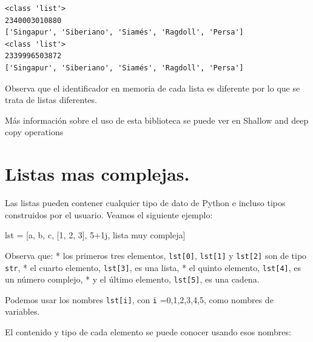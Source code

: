 \documentclass[
  spanish,
  letterpaper,
]{scrbook}
\newenvironment{Shaded}{\begin{snugshade}}{\end{snugshade}}
\newcommand{\DecValTok}[1]{\textcolor[rgb]{0.68,0.00,0.00}{#1}}
\newcommand{\NormalTok}[1]{\textcolor[rgb]{0.00,0.23,0.31}{#1}}
\newcommand{\OperatorTok}[1]{\textcolor[rgb]{0.37,0.37,0.37}{#1}}
\newcommand{\OtherTok}[1]{\textcolor[rgb]{0.00,0.23,0.31}{#1}}
\newcommand{\StringTok}[1]{\textcolor[rgb]{0.13,0.47,0.30}{#1}}
\theoremstyle{definition}
\theoremstyle{remark}
\begin{document}
\begin{verbatim}
<class 'list'>
2340003010880
['Singapur', 'Siberiano', 'Siamés', 'Ragdoll', 'Persa']
<class 'list'>
2339996503872
['Singapur', 'Siberiano', 'Siamés', 'Ragdoll', 'Persa']
\end{verbatim}

Observa que el identificador en memoria de cada lista es diferente por
lo que se trata de listas diferentes.

Más información sobre el uso de esta biblioteca se puede ver en Shallow
and deep copy operations

\section{Listas mas complejas.}\label{listas-mas-complejas.}

Las listas pueden contener cualquier tipo de dato de Python e incluso
tipos construidos por el usuario. Veamos el siguiente ejemplo:

\begin{Shaded}
\begin{Highlighting}[]
\NormalTok{lst }\OperatorTok{=}\NormalTok{ [}\StringTok{\textquotesingle{}a\textquotesingle{}}\NormalTok{, }\StringTok{\textquotesingle{}b\textquotesingle{}}\NormalTok{, }\StringTok{\textquotesingle{}c\textquotesingle{}}\NormalTok{, [}\DecValTok{1}\NormalTok{, }\DecValTok{2}\NormalTok{, }\DecValTok{3}\NormalTok{], }\DecValTok{5}\OperatorTok{+}\OtherTok{1j}\NormalTok{, }\StringTok{\textquotesingle{}lista muy compleja\textquotesingle{}}\NormalTok{]}
\end{Highlighting}
\end{Shaded}

Observa que: * los primeros tres elementos, \texttt{lst{[}0{]}},
\texttt{lst{[}1{]}} y \texttt{lst{[}2{]}} son de tipo \texttt{str}, * el
cuarto elemento, \texttt{lst{[}3{]}}, es una lista, * el quinto
elemento, \texttt{lst{[}4{]}}, es un número complejo, * y el último
elemento, \texttt{lst{[}5{]}}, es una cadena.

Podemos usar los nombres \texttt{lst{[}i{]}}, con \texttt{i}
=0,1,2,3,4,5, como nombres de variables.

El contenido y tipo de cada elemento se puede conocer usando esos
nombres:
\end{document}
